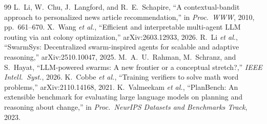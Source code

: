 \documentclass[12pt,a4paper]{article}
\begin{document}
\begin{thebibliography}{99}
 L.~Li, W.~Chu, J.~Langford, and R.~E.~Schapire, ``A contextual-bandit approach to personalized news article recommendation,'' in \emph{Proc.\ WWW}, 2010, pp.~661--670.
 X.~Wang \emph{et al.}, ``Efficient and interpretable multi-agent LLM routing via ant colony optimization,'' arXiv:2603.12933, 2026.
 R.~Li \emph{et al.}, ``SwarmSys: Decentralized swarm-inspired agents for scalable and adaptive reasoning,'' arXiv:2510.10047, 2025.
 M.~A.~U.~Rahman, M.~Schranz, and S.~Hayat, ``LLM-powered swarms: A new frontier or a conceptual stretch?,'' \emph{IEEE Intell.\ Syst.}, 2026.
 K.~Cobbe \emph{et al.}, ``Training verifiers to solve math word problems,'' arXiv:2110.14168, 2021.
 K.~Valmeekam \emph{et al.}, ``PlanBench: An extensible benchmark for evaluating large language models on planning and reasoning about change,'' in \emph{Proc.\ NeurIPS Datasets and Benchmarks Track}, 2023.
\end{thebibliography}
\end{document}
